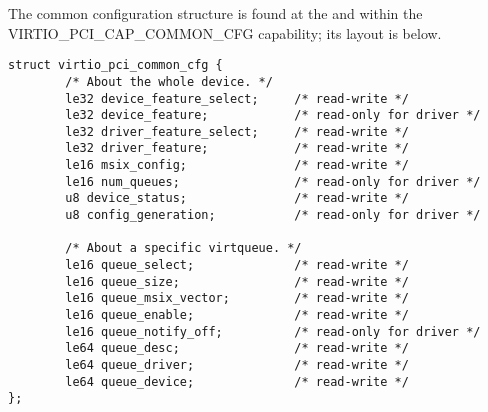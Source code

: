 The common configuration structure is found at the  and  within the VIRTIO_PCI_CAP_COMMON_CFG capability; its layout is below.

\begin{lstlisting}
struct virtio_pci_common_cfg {
        /* About the whole device. */
        le32 device_feature_select;     /* read-write */
        le32 device_feature;            /* read-only for driver */
        le32 driver_feature_select;     /* read-write */
        le32 driver_feature;            /* read-write */
        le16 msix_config;               /* read-write */
        le16 num_queues;                /* read-only for driver */
        u8 device_status;               /* read-write */
        u8 config_generation;           /* read-only for driver */

        /* About a specific virtqueue. */
        le16 queue_select;              /* read-write */
        le16 queue_size;                /* read-write */
        le16 queue_msix_vector;         /* read-write */
        le16 queue_enable;              /* read-write */
        le16 queue_notify_off;          /* read-only for driver */
        le64 queue_desc;                /* read-write */
        le64 queue_driver;              /* read-write */
        le64 queue_device;              /* read-write */
};
\end{lstlisting}

